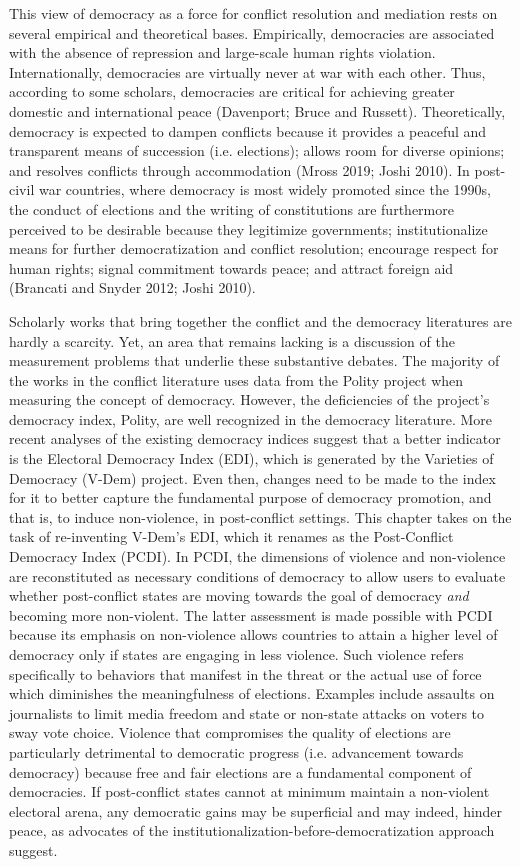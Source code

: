 \documentclass [11pt]{article}
\begin{document}
This view of democracy as a force for conflict resolution and mediation rests on several empirical and theoretical bases. Empirically, democracies are associated with the absence of repression and large-scale human rights violation. Internationally, democracies are virtually never at war with each other. Thus, according to some scholars, democracies are critical for achieving greater domestic and international peace (Davenport; Bruce and Russett). Theoretically, democracy is expected to dampen conflicts because it provides a peaceful and transparent means of succession (i.e. elections); allows room for diverse opinions; and resolves conflicts through accommodation (Mross 2019; Joshi 2010). In post-civil war countries, where democracy is most widely promoted since the 1990s, the conduct of elections and the writing of constitutions are furthermore perceived to be desirable because they legitimize governments; institutionalize means for further democratization and conflict resolution; encourage respect for human rights; signal commitment towards peace; and attract foreign aid (Brancati and Snyder 2012; Joshi 2010).

Scholarly works that bring together the conflict and the democracy literatures are hardly a scarcity. Yet, an area that remains lacking is a discussion of the measurement problems that underlie these substantive debates. The majority of the works in the conflict literature uses data from the Polity project when measuring the concept of democracy. However, the deficiencies of the project's democracy index, Polity, are well recognized in the democracy literature. More recent analyses of the existing democracy indices suggest that a better indicator is the Electoral Democracy Index (EDI), which is generated by the Varieties of Democracy (V-Dem) project. Even then, changes need to be made to the index for it to better capture the fundamental purpose of democracy promotion, and that is, to induce non-violence, in post-conflict settings. This chapter takes on the task of re-inventing V-Dem's EDI, which it renames as the Post-Conflict Democracy Index (PCDI). In PCDI, the dimensions of violence and non-violence are reconstituted as necessary conditions of democracy to allow users to evaluate whether post-conflict states are moving towards the goal of democracy \emph{and} becoming more non-violent. The latter assessment is made possible with PCDI because its emphasis on non-violence allows countries to attain a higher level of democracy only if states are engaging in less violence. Such violence refers specifically to behaviors that manifest in the threat or the actual use of force which diminishes the meaningfulness of elections. Examples include assaults on journalists to limit media freedom and state or non-state attacks on voters to sway vote choice. Violence that compromises the quality of elections are particularly detrimental to democratic progress (i.e. advancement towards democracy) because free and fair elections are a fundamental component of democracies. If post-conflict states cannot at minimum maintain a non-violent electoral arena, any democratic gains may be superficial and may indeed, hinder peace, as advocates of the institutionalization-before-democratization approach suggest.
\end{document}
